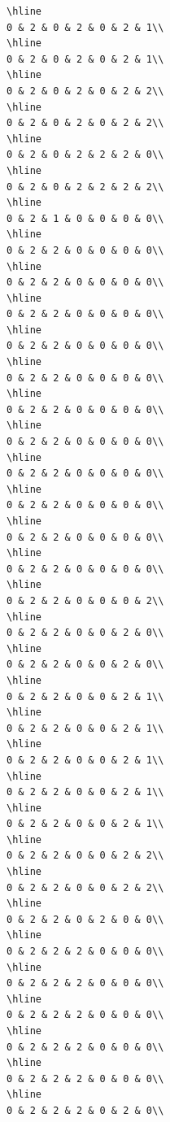 \documentclass[
]{article}
\begin{document}
\begin{verbatim}
\hline
0 & 2 & 0 & 2 & 0 & 2 & 1\\
\hline
0 & 2 & 0 & 2 & 0 & 2 & 1\\
\hline
0 & 2 & 0 & 2 & 0 & 2 & 2\\
\hline
0 & 2 & 0 & 2 & 0 & 2 & 2\\
\hline
0 & 2 & 0 & 2 & 2 & 2 & 0\\
\hline
0 & 2 & 0 & 2 & 2 & 2 & 2\\
\hline
0 & 2 & 1 & 0 & 0 & 0 & 0\\
\hline
0 & 2 & 2 & 0 & 0 & 0 & 0\\
\hline
0 & 2 & 2 & 0 & 0 & 0 & 0\\
\hline
0 & 2 & 2 & 0 & 0 & 0 & 0\\
\hline
0 & 2 & 2 & 0 & 0 & 0 & 0\\
\hline
0 & 2 & 2 & 0 & 0 & 0 & 0\\
\hline
0 & 2 & 2 & 0 & 0 & 0 & 0\\
\hline
0 & 2 & 2 & 0 & 0 & 0 & 0\\
\hline
0 & 2 & 2 & 0 & 0 & 0 & 0\\
\hline
0 & 2 & 2 & 0 & 0 & 0 & 0\\
\hline
0 & 2 & 2 & 0 & 0 & 0 & 0\\
\hline
0 & 2 & 2 & 0 & 0 & 0 & 0\\
\hline
0 & 2 & 2 & 0 & 0 & 0 & 2\\
\hline
0 & 2 & 2 & 0 & 0 & 2 & 0\\
\hline
0 & 2 & 2 & 0 & 0 & 2 & 0\\
\hline
0 & 2 & 2 & 0 & 0 & 2 & 1\\
\hline
0 & 2 & 2 & 0 & 0 & 2 & 1\\
\hline
0 & 2 & 2 & 0 & 0 & 2 & 1\\
\hline
0 & 2 & 2 & 0 & 0 & 2 & 1\\
\hline
0 & 2 & 2 & 0 & 0 & 2 & 1\\
\hline
0 & 2 & 2 & 0 & 0 & 2 & 2\\
\hline
0 & 2 & 2 & 0 & 0 & 2 & 2\\
\hline
0 & 2 & 2 & 0 & 2 & 0 & 0\\
\hline
0 & 2 & 2 & 2 & 0 & 0 & 0\\
\hline
0 & 2 & 2 & 2 & 0 & 0 & 0\\
\hline
0 & 2 & 2 & 2 & 0 & 0 & 0\\
\hline
0 & 2 & 2 & 2 & 0 & 0 & 0\\
\hline
0 & 2 & 2 & 2 & 0 & 0 & 0\\
\hline
0 & 2 & 2 & 2 & 0 & 2 & 0\\

\end{verbatim}
\end{document}
